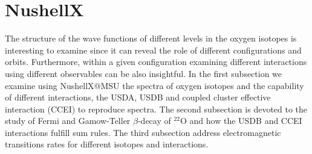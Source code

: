 \section{NushellX}
The structure of the wave functions of different levels in the oxygen isotopes is interesting to examine since it can reveal the role of different configurations and orbits. Furthermore, within a given configuration examining different interactions using different observables can be also insightful. 
In the first subsection we examine using NushellX@MSU the spectra of oxygen isotopes and the capability of different interactions, the USDA, USDB and coupled cluster effective interaction (CCEI) \cite{Jansen2016} to reproduce spectra. The second subsection is devoted to the study of Fermi and Gamow-Teller $\beta$-decay of $^{22}$O and how the USDB and CCEI interactions fulfill sum rules. The third subsection address electromagnetic transitions rates for different isotopes and interactions.
